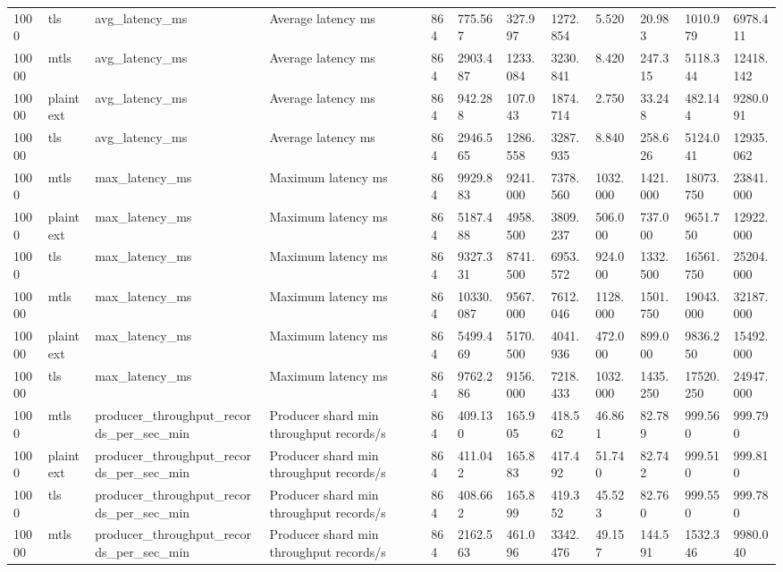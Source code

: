 \begin{longtable}{llllllllllll}
1000 & tls & avg\_latency\_ms & Average latency ms & 864 & 775.567 & 327.997 & 1272.854 & 5.520 & 20.983 & 1010.979 & 6978.411 \\
10000 & mtls & avg\_latency\_ms & Average latency ms & 864 & 2903.487 & 1233.084 & 3230.841 & 8.420 & 247.315 & 5118.344 & 12418.142 \\
10000 & plaintext & avg\_latency\_ms & Average latency ms & 864 & 942.288 & 107.043 & 1874.714 & 2.750 & 33.248 & 482.144 & 9280.091 \\
10000 & tls & avg\_latency\_ms & Average latency ms & 864 & 2946.565 & 1286.558 & 3287.935 & 8.840 & 258.626 & 5124.041 & 12935.062 \\
1000 & mtls & max\_latency\_ms & Maximum latency ms & 864 & 9929.883 & 9241.000 & 7378.560 & 1032.000 & 1421.000 & 18073.750 & 23841.000 \\
1000 & plaintext & max\_latency\_ms & Maximum latency ms & 864 & 5187.488 & 4958.500 & 3809.237 & 506.000 & 737.000 & 9651.750 & 12922.000 \\
1000 & tls & max\_latency\_ms & Maximum latency ms & 864 & 9327.331 & 8741.500 & 6953.572 & 924.000 & 1332.500 & 16561.750 & 25204.000 \\
10000 & mtls & max\_latency\_ms & Maximum latency ms & 864 & 10330.087 & 9567.000 & 7612.046 & 1128.000 & 1501.750 & 19043.000 & 32187.000 \\
10000 & plaintext & max\_latency\_ms & Maximum latency ms & 864 & 5499.469 & 5170.500 & 4041.936 & 472.000 & 899.000 & 9836.250 & 15492.000 \\
10000 & tls & max\_latency\_ms & Maximum latency ms & 864 & 9762.286 & 9156.000 & 7218.433 & 1032.000 & 1435.250 & 17520.250 & 24947.000 \\
1000 & mtls & producer\_throughput\_records\_per\_sec\_min & Producer shard min throughput records/s & 864 & 409.130 & 165.905 & 418.562 & 46.861 & 82.789 & 999.560 & 999.790 \\
1000 & plaintext & producer\_throughput\_records\_per\_sec\_min & Producer shard min throughput records/s & 864 & 411.042 & 165.883 & 417.492 & 51.740 & 82.742 & 999.510 & 999.810 \\
1000 & tls & producer\_throughput\_records\_per\_sec\_min & Producer shard min throughput records/s & 864 & 408.662 & 165.899 & 419.352 & 45.523 & 82.760 & 999.550 & 999.780 \\
10000 & mtls & producer\_throughput\_records\_per\_sec\_min & Producer shard min throughput records/s & 864 & 2162.563 & 461.096 & 3342.476 & 49.157 & 144.591 & 1532.346 & 9980.040 \\

\end{longtable}
